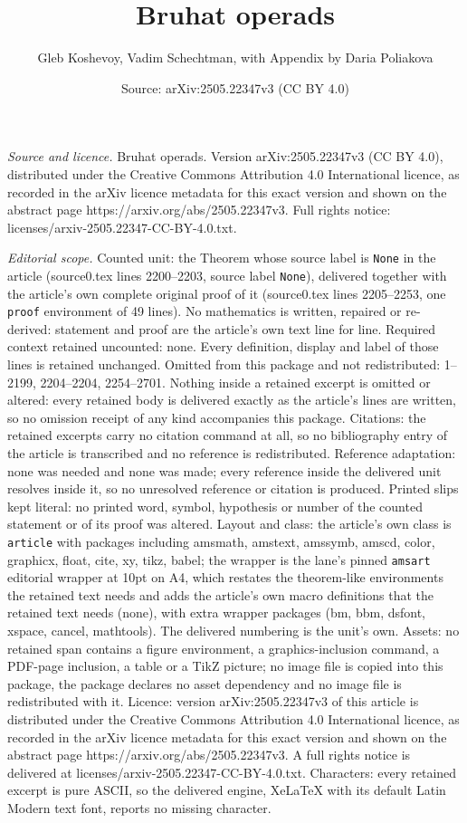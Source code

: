 \documentclass[10pt,a4paper]{amsart}
\title[Bruhat operads]{Bruhat operads}
\author{Gleb Koshevoy, Vadim Schechtman, with Appendix by Daria Poliakova}
\date{Source: arXiv:2505.22347v3 (CC BY 4.0)}
\begin{document}
\maketitle

\noindent\emph{Source and licence.} Bruhat operads. Version arXiv:2505.22347v3 (CC BY 4.0), distributed under the Creative Commons Attribution 4.0 International licence, as recorded in the arXiv licence metadata for this exact version and shown on the abstract page https://arxiv.org/abs/2505.22347v3. Full rights notice: licenses/arxiv-2505.22347-CC-BY-4.0.txt.\par\smallskip

\noindent\textit{Editorial scope.} Counted unit: the Theorem whose source label is \texttt{None} in the article (source0.tex lines 2200--2203, source label \texttt{None}), delivered together with the article's own complete original proof of it (source0.tex lines 2205--2253, one \texttt{proof} environment of 49 lines). No mathematics is written, repaired or re-derived: statement and proof are the article's own text line for line. Required context retained uncounted: none. Every definition, display and label of those lines is retained unchanged. Omitted from this package and not redistributed: 1--2199, 2204--2204, 2254--2701. Nothing inside a retained excerpt is omitted or altered: every retained body is delivered exactly as the article's lines are written, so no omission receipt of any kind accompanies this package. Citations: the retained excerpts carry no citation command at all, so no bibliography entry of the article is transcribed and no reference is redistributed. Reference adaptation: none was needed and none was made; every reference inside the delivered unit resolves inside it, so no unresolved reference or citation is produced. Printed slips kept literal: no printed word, symbol, hypothesis or number of the counted statement or of its proof was altered. Layout and class: the article's own class is \texttt{article} with packages including amsmath, amstext, amssymb, amscd, color, graphicx, float, cite, xy, tikz, babel; the wrapper is the lane's pinned \texttt{amsart} editorial wrapper at 10pt on A4, which restates the theorem-like environments the retained text needs and adds the article's own macro definitions that the retained text needs (none), with extra wrapper packages (bm, bbm, dsfont, xspace, cancel, mathtools). The delivered numbering is the unit's own. Assets: no retained span contains a figure environment, a graphics-inclusion command, a PDF-page inclusion, a table or a TikZ picture; no image file is copied into this package, the package declares no asset dependency and no image file is redistributed with it. Licence: version arXiv:2505.22347v3 of this article is distributed under the Creative Commons Attribution 4.0 International licence, as recorded in the arXiv licence metadata for this exact version and shown on the abstract page https://arxiv.org/abs/2505.22347v3. A full rights notice is delivered at licenses/arxiv-2505.22347-CC-BY-4.0.txt. Characters: every retained excerpt is pure ASCII, so the delivered engine, XeLaTeX with its default Latin Modern text font, reports no missing character.
\end{document}

